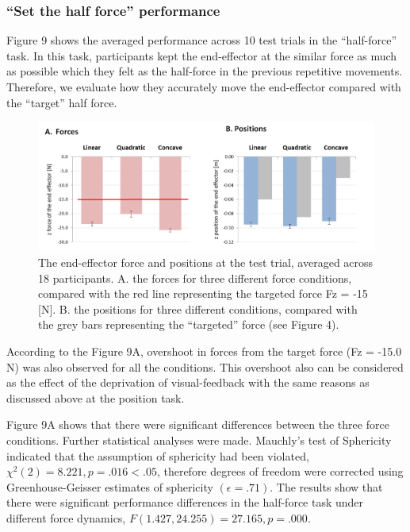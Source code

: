 \subsubsection{“Set the half force” performance}
Figure 9 shows the averaged performance across 10 test trials in the “half-force” task. In this task, participants kept the end-effector at the similar force as much as possible which they felt as the half-force in the previous repetitive movements. Therefore, we evaluate how they accurately move the end-effector compared with the “target” half force. 
%
\begin{figure}
  \centering
  \includegraphics[scale=0.5]{Chie/figs/Figure9.png}
  \caption{The end-effector force and positions at the test trial, averaged across 18 participants. 
A. the forces for three different force conditions, compared with the red line representing the targeted force Fz = -15 [N].  B. the positions for three different conditions, compared with the grey bars representing the “targeted” force (see Figure 4).}
  \label{half-force}
\end{figure}
According to the Figure 9A, overshoot in forces  from the target force (Fz = -15.0 N) was also observed for  all the conditions. This overshoot also can be considered as the effect of the deprivation of visual-feedback with the same reasons as discussed above at the position task.

Figure 9A shows that there were significant differences between the three force conditions. Further statistical analyses were made. Mauchly’s test of Sphericity indicated that the assumption of sphericity had been violated, $χ^2 (2) = 8.221, p = .016 < .05$, therefore degrees of freedom were corrected using Greenhouse-Geisser estimates of sphericity $(\epsilon = .71)$. The results show that there were significant performance differences in the half-force task under different force dynamics, $F(1.427, 24.255) = 27.165, p = .000$.

